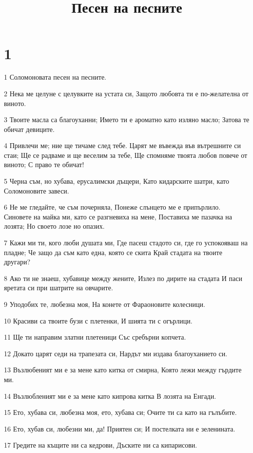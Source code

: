 

\title{Песен на песните}


\chapter{1}

\par 1 Соломоновата песен на песните.
\par 2 Нека ме целуне с целувките на устата си, Защото любовта ти е по-желателна от виното.
\par 3 Твоите масла са благоуханни; Името ти е ароматно като изляно масло; Затова те обичат девиците.
\par 4 Привлечи ме; ние ще тичаме след тебе. Царят ме въвежда във вътрешните си стаи; Ще се радваме и ще веселим за тебе, Ще спомняме твоята любов повече от виното; С право те обичат!
\par 5 Черна съм, но хубава, ерусалимски дъщери, Като кидарските шатри, като Соломоновите завеси.
\par 6 Не ме гледайте, че съм почерняла, Понеже слънцето ме е припърлило. Синовете на майка ми, като се разгневиха на мене, Поставиха ме пазачка на лозята; Но своето лозе но опазих.
\par 7 Кажи ми ти, кого люби душата ми, Где пасеш стадото си, где го успокояваш на пладне; Че защо да съм като една, която се скита Край стадата на твоите другари?
\par 8 Ако ти не знаеш, хубавице между жените, Излез по дирите на стадата И паси яретата си при шатрите на овчарите.
\par 9 Уподобих те, любезна моя, На конете от Фараоновите колесници.
\par 10 Красиви са твоите бузи с плетенки, И шията ти с огърлици.
\par 11 Ще ти направим златни плетеници Със сребърни копчета.
\par 12 Докато царят седи на трапезата си, Нардът ми издава благоуханието си.
\par 13 Възлюбеният ми е за мене като китка от смирна, Която лежи между гърдите ми.
\par 14 Възлюбленият ми е за мене като кипрова китка В лозята на Енгади.
\par 15 Ето, хубава си, любезна моя, ето, хубава си; Очите ти са като на гълъбите.
\par 16 Ето, хубав си, любезни ми, да! Приятен си; И постелката ни е зеленината.
\par 17 Гредите на къщите ни са кедрови, Дъските ни са кипарисови.

